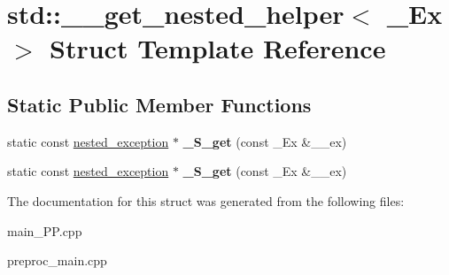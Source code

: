 \hypertarget{structstd_1_1____get__nested__helper}{\section{std\+:\+:\+\_\+\+\_\+get\+\_\+nested\+\_\+helper$<$ \+\_\+\+Ex $>$ Struct Template Reference}
\label{structstd_1_1____get__nested__helper}
}
\subsection*{Static Public Member Functions}
\begin{DoxyCompactItemize}
\item 
\hypertarget{structstd_1_1____get__nested__helper_ae7bd44a8e346ac03da557e5075ad17bc}{static const \hyperlink{classstd_1_1nested__exception}{nested\+\_\+exception} $\ast$ {\bfseries \+\_\+\+S\+\_\+get} (const \+\_\+\+Ex \&\+\_\+\+\_\+ex)}\label{structstd_1_1____get__nested__helper_ae7bd44a8e346ac03da557e5075ad17bc}

\item 
\hypertarget{structstd_1_1____get__nested__helper_ae7bd44a8e346ac03da557e5075ad17bc}{static const \hyperlink{classstd_1_1nested__exception}{nested\+\_\+exception} $\ast$ {\bfseries \+\_\+\+S\+\_\+get} (const \+\_\+\+Ex \&\+\_\+\+\_\+ex)}\label{structstd_1_1____get__nested__helper_ae7bd44a8e346ac03da557e5075ad17bc}

\end{DoxyCompactItemize}


The documentation for this struct was generated from the following files\+:\begin{DoxyCompactItemize}
\item 
main\+\_\+\+P\+P.\+cpp\item 
preproc\+\_\+main.\+cpp\end{DoxyCompactItemize}
